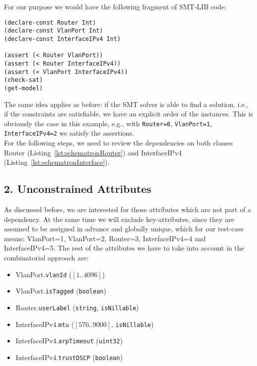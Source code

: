 For our purpose we would have the following fragment of SMT-LIB code:
\begin{verbatim}
(declare-const Router Int)
(declare-const VlanPort Int)
(declare-const InterfaceIPv4 Int)

(assert (< Router VlanPort))
(assert (< Router InterfaceIPv4))
(assert (< VlanPort InterfaceIPv4))
(check-sat)
(get-model)
\end{verbatim}

The same idea applies as before: if the SMT solver is able to find a solution, i.e., if the constraints are satisfiable, we have an explicit order of the instances. This is obviously the case in this example, e.g., with \verb|Router=0|, \verb|VlanPort=1|, \verb|InterfaceIPv4=2| we satisfy the assertions.\\

For the following steps, we need to review the dependencies on both classes \textsf{Router} (Listing~\ref{lst:schematronRouter}) and \textsf{InterfaceIPv4} (Listing~\ref{lst:schematronInterface}). 

\subsection*{2. Unconstrained Attributes}

As discussed before, we are interested for those attributes which are not part of a dependency. At the same time we will exclude key-attributes, since they are assumed to be assigned in advance and globally unique, which for our test-case means: \textsf{VlanPort=1}, \textsf{VlanPort=2}, \textsf{Router=3}, \textsf{InterfaceIPv4=4} and \textsf{InterfaceIPv4=5}. The rest of the attributes we have to take into account in the combinatorial approach are:

\begin{itemize}
 \item \textsf{VlanPort.}\verb|vlanId| ($[1..4096]$)
 \item \textsf{VlanPort.}\verb|isTagged| (\verb|boolean|)
 \item \textsf{Router.}\verb|userLabel| (\verb|string|, \verb|isNillable|)
 \item \textsf{InterfaceIPv4.}\verb|mtu| ($[576..9000]$, \verb|isNillable|)
 \item \textsf{InterfaceIPv4.}\verb|arpTimeout| (\verb|uint32|)
 \item \textsf{InterfaceIPv4.}\verb|trustDSCP| (\verb|boolean|)
\end{itemize}

